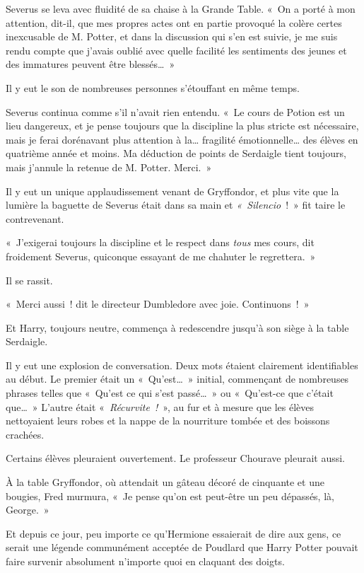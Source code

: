 Severus se leva avec fluidité de sa chaise à la Grande Table.
«~On a porté à mon attention, dit-il, que mes propres actes ont en partie provoqué la colère certes inexcusable de M. Potter, et dans la discussion qui s'en est suivie, je me suis rendu compte que j'avais oublié avec quelle facilité les sentiments des jeunes et des immatures peuvent être blessés…~»

Il y eut le son de nombreuses personnes s'étouffant en même temps.

Severus continua comme s'il n'avait rien entendu.
«~Le cours de Potion est un lieu dangereux, et je pense toujours que la discipline la plus stricte est nécessaire, mais je ferai dorénavant plus attention à la… fragilité émotionnelle… des élèves en quatrième année et moins.
Ma déduction de points de Serdaigle tient toujours, mais j'annule la retenue de M. Potter.
Merci.~»

Il y eut un unique applaudissement venant de Gryffondor, et plus vite que la lumière la baguette de Severus était dans sa main et \emph{«~Silencio}~!~»
fit taire le contrevenant.

«~J'exigerai toujours la discipline et le respect dans \emph{tous} mes cours, dit froidement Severus, quiconque essayant de me chahuter le regrettera.~»

Il se rassit.

«~Merci aussi~! dit le directeur Dumbledore avec joie.
Continuons~!~»

Et Harry, toujours neutre, commença à redescendre jusqu'à son siège à la table Serdaigle.

Il y eut une explosion de conversation.
Deux mots étaient clairement identifiables au début.
Le premier était un «~Qu'est…~»
initial, commençant de nombreuses phrases telles que «~Qu'est ce qui s'est passé…~»
ou «~Qu'est-ce que c'était que…~»
 L'autre était «~\emph{Récurvite~!}~», au fur et à mesure que les élèves nettoyaient leurs robes et la nappe de la nourriture tombée et des boissons crachées.

Certains élèves pleuraient ouvertement.
Le professeur Chourave pleurait aussi.

À la table Gryffondor, où attendait un gâteau décoré de cinquante et une bougies, Fred murmura, «~Je pense qu'on est peut-être un peu dépassés, là, George.~»

Et depuis ce jour, peu importe ce qu'Hermione essaierait de dire aux gens, ce serait une légende communément acceptée de Poudlard que Harry Potter pouvait faire survenir absolument n'importe quoi en claquant des doigts.~

